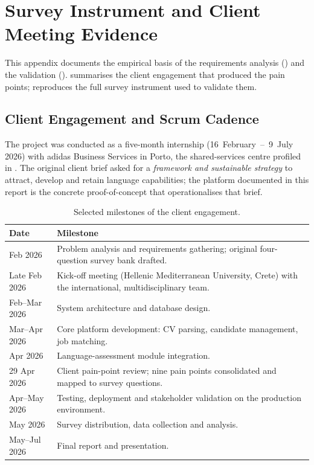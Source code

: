 ﻿\chapter{Survey Instrument and Client Meeting Evidence}
\label{app:survey}

This appendix documents the empirical basis of the requirements analysis
() and the validation ().
 summarises the client engagement that
produced the pain points;  reproduces the
full survey instrument used to validate them.

\section{Client Engagement and Scrum Cadence}
\label{app:survey-meeting}

The project was conducted as a five-month internship (16~February~--~9~July
2026) with adidas Business Services in Porto, the shared-services centre
profiled in . The original client brief
asked for a \emph{framework and sustainable strategy} to attract, develop and
retain language capabilities; the platform documented in this report is the
concrete proof-of-concept that operationalises that brief.

\begin{table}[ht]
	\centering
	\caption{Selected milestones of the client engagement.}
	\label{tab:meeting-log}
	\begin{tabular}{@{}l p{8.5cm}@{}}
		\toprule
		\textbf{Date} & \textbf{Milestone} \\
		\midrule
		Feb 2026      & Problem analysis and requirements gathering; original four-question survey bank drafted. \\
		Late Feb 2026 & Kick-off meeting (Hellenic Mediterranean University, Crete) with the international, multidisciplinary team. \\
		Feb--Mar 2026 & System architecture and database design. \\
		Mar--Apr 2026 & Core platform development: CV parsing, candidate management, job matching. \\
		Apr 2026      & Language-assessment module integration. \\
		29 Apr 2026   & Client pain-point review; nine pain points consolidated and mapped to survey questions. \\
		Apr--May 2026 & Testing, deployment and stakeholder validation on the production environment. \\
		May 2026      & Survey distribution, data collection and analysis. \\
		May--Jul 2026 & Final report and presentation. \\
		\bottomrule
	\end{tabular}
\end{table}

